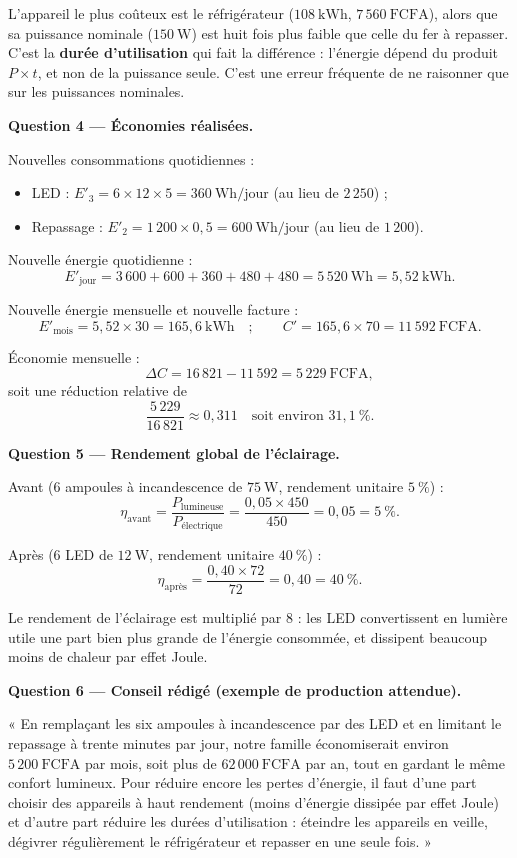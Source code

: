 \documentclass[11pt]{article}
\newcommand{\cle}[1]{{\popxbold\color{popdark}#1}}
\begin{document}
\begin{exoresolu}
L'appareil le plus coûteux est le \cle{réfrigérateur} ($108~\mathrm{kWh}$, $7\,560~\mathrm{FCFA}$), alors que sa puissance nominale ($150~\mathrm{W}$) est huit fois plus faible que celle du fer à repasser. C'est la \textbf{durée d'utilisation} qui fait la différence : l'énergie dépend du produit $P \times t$, et non de la puissance seule. C'est une erreur fréquente de ne raisonner que sur les puissances nominales.

\textbf{Question 4 — Économies réalisées.}

Nouvelles consommations quotidiennes :
\begin{itemize}
\item LED : $E'_3 = 6 \times 12 \times 5 = 360~\mathrm{Wh/jour}$ (au lieu de $2\,250$) ;
\item Repassage : $E'_2 = 1\,200 \times 0{,}5 = 600~\mathrm{Wh/jour}$ (au lieu de $1\,200$).
\end{itemize}

Nouvelle énergie quotidienne :
\[ E'_{\text{jour}} = 3\,600 + 600 + 360 + 480 + 480 = 5\,520~\mathrm{Wh} = 5{,}52~\mathrm{kWh}. \]

Nouvelle énergie mensuelle et nouvelle facture :
\[ E'_{\text{mois}} = 5{,}52 \times 30 = 165{,}6~\mathrm{kWh} \quad;\qquad C' = 165{,}6 \times 70 = 11\,592~\mathrm{FCFA}. \]

Économie mensuelle :
\[ \Delta C = 16\,821 - 11\,592 = 5\,229~\mathrm{FCFA}, \]
soit une réduction relative de
\[ \dfrac{5\,229}{16\,821} \approx 0{,}311 \quad \text{soit environ } 31,1~\%. \]

\textbf{Question 5 — Rendement global de l'éclairage.}

Avant (6 ampoules à incandescence de $75~\mathrm{W}$, rendement unitaire $5~\%$) :
\[ \eta_{\text{avant}} = \dfrac{P_{\text{lumineuse}}}{P_{\text{électrique}}} = \dfrac{0{,}05 \times 450}{450} = 0{,}05 = 5~\%. \]

Après (6 LED de $12~\mathrm{W}$, rendement unitaire $40~\%$) :
\[ \eta_{\text{après}} = \dfrac{0{,}40 \times 72}{72} = 0{,}40 = 40~\%. \]

Le rendement de l'éclairage est multiplié par 8 : les LED convertissent en lumière utile une part bien plus grande de l'énergie consommée, et dissipent beaucoup moins de chaleur par effet Joule.

\textbf{Question 6 — Conseil rédigé (exemple de production attendue).}

« En remplaçant les six ampoules à incandescence par des LED et en limitant le repassage à trente minutes par jour, notre famille économiserait environ $5\,200~\mathrm{FCFA}$ par mois, soit plus de $62\,000~\mathrm{FCFA}$ par an, tout en gardant le même confort lumineux. Pour réduire encore les pertes d'énergie, il faut d'une part choisir des appareils à haut rendement (moins d'énergie dissipée par effet Joule) et d'autre part réduire les durées d'utilisation : éteindre les appareils en veille, dégivrer régulièrement le réfrigérateur et repasser en une seule fois. »
\end{exoresolu}
\end{document}
